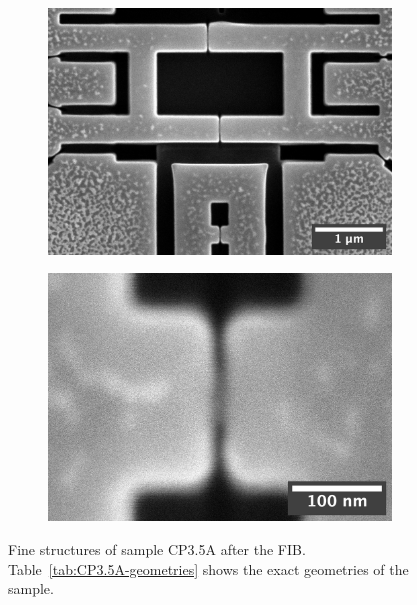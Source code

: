 \begin{figure}[ht!]
	\begin{subfigure}[t]{0.45\textwidth}
		\centering
		\includegraphics[width=\textwidth]{figures/samples/CP3/CP3.5A_SEM_overview.jpg}
	\end{subfigure}
	\hfill
	\begin{subfigure}[t]{0.45\textwidth}
		\centering
		\includegraphics[width=\textwidth]{figures/samples/CP3/CP3.5A_SEM_junction.jpg}
	\end{subfigure}
	
	\caption{Fine structures of sample CP3.5A after the FIB. Table~\ref{tab:CP3.5A-geometries} shows the exact geometries of the sample.}
	\label{fig:CP3.5A-SEM-images}
\end{figure}

